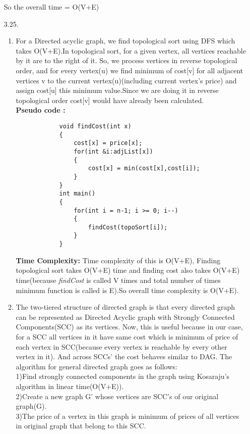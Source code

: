 \documentclass[12pt]{article}
\begin{document}
\begin{enumerate}
    So the overall time = O(V+E)
    \item[3.25.]
    \begin{enumerate}
        \item 
        For a Directed acyclic graph, we find topological sort using DFS which takes O(V+E).In topological sort, for a given vertex, all vertices reachable by it are to the right of it.
        So, we process vertices in reverse topological order, and for every vertex(u) we find minimum of cost[v] for all adjacent vertices v to the current vertex(u)(including current vertex's price) and assign cost[u] this minimum value.Since we are doing it in reverse topological order cost[v] would have already been calculated.
       \\ \textbf{Pseudo code :}
        \begin{verbatim}
            void findCost(int x)
            {
                cost[x] = price[x];
                for(int &i:adjList[x])
                {
                    cost[x] = min(cost[x],cost[i]);
                }
            }
            int main()
            {
                for(int i = n-1; i >= 0; i--)
                {
                    findCost(topoSort[i]);
                }
            }
        \end{verbatim}
        \textbf{Time Complexity:}
        Time complexity of this is O(V+E), Finding topological sort takes O(V+E) time and finding cost also takes O(V+E) time(because \emph{findCost} is called V times and total number of times minimum function is called is E).So overall time complexity is O(V+E).
        \item
        The two-tiered structure of directed graph is that every directed graph can be represented as Directed Acyclic graph with Strongly Connected Components(SCC) as its vertices.
        Now, this is useful because in our case, for a SCC all vertices in it have same cost which is minimum of price of each vertex in SCC(because every vertex is reachable by every other vertex in it). And across SCCs' the cost behaves similar to DAG.
        The algorithm for general directed graph goes as follows:\\
        1)Find strongly connected components in the graph using Kosaraju's algorithm in linear time(O(V+E)).\\
        2)Create a new graph G' whose vertices are SCC's of our original graph(G).\\
        3)The price of a vertex in this graph is minimum of prices of all vertices in original graph that belong to this SCC.\\

\end{enumerate}
\end{enumerate}
\end{document}
